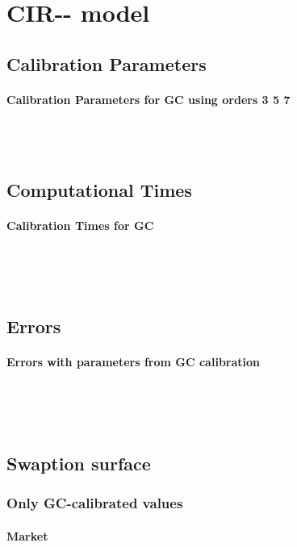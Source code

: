 \section{CIR-{}- model}
\subsection{Calibration Parameters}
\paragraph*{Calibration Parameters for GC using orders 3  5  7}\hfill\\
	
	\calParamGCB\hfill\\
\subsection{Computational Times}
\paragraph*{Calibration Times for GC}\hfill\\
\noindent
	
	\calTimesGCB
\hfill\\
\subsection{Errors}
\paragraph*{Errors with parameters from GC calibration}\hfill\\
\noindent
	
	\errGCParamB
\hfill\\
\subsection{Swaption surface}
\subsubsection{Only GC-calibrated values}
\paragraph*{Market}\hfill\\
\noindent
	
\begin{table}
\centering
	\swaptionMarketB\hfill\\
\caption{\swaptionMarketcaptionB}
\end{table}
\FloatBarrier
